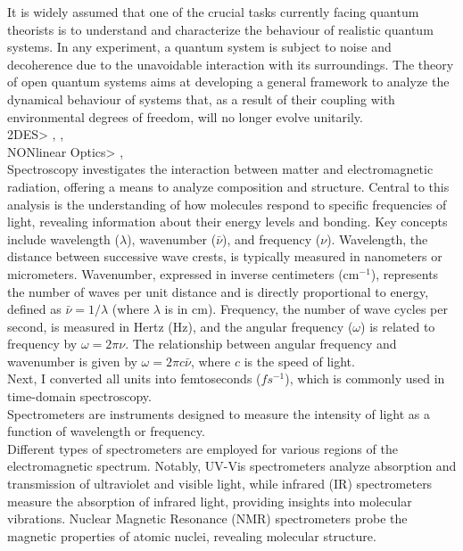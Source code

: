It is widely assumed that one of the crucial tasks currently facing quantum theorists
is to understand and characterize the behaviour of realistic quantum systems. In
any experiment, a quantum system is subject to noise and decoherence due to the
unavoidable interaction with its surroundings. The theory of open quantum systems
aims at developing a general framework to analyze the dynamical behaviour of systems
that, as a result of their coupling with environmental degrees of freedom, will no
longer evolve unitarily. \cite{rivasMarkovianMasterEquations2010}
\\
2DES> \cite{krumlandTwodimensionalElectronicSpectroscopy2023}, \cite{segarra-martiAccurateSimulationTwoDimensional2018}, \cite{sunTwodimensionalSpectroscopyOpen2024}
\\
NONlinear Optics> \cite{hammPrinciplesNonlinearOptical}, \cite{mukamelPrinciplesNonlinearOptical1995}
\\
Spectroscopy investigates the interaction between matter and electromagnetic radiation, offering a means to analyze composition and structure.
Central to this analysis is the understanding of how molecules respond to specific frequencies of light, revealing information about their energy levels and bonding.
Key concepts include wavelength ($\lambda$), wavenumber ($\bar{\nu}$), and frequency ($\nu$).
Wavelength, the distance between successive wave crests, is typically measured in nanometers or micrometers.
Wavenumber, expressed in inverse centimeters (cm$^{-1}$), represents the number of waves per unit distance and is directly proportional to energy, defined as $\bar{\nu} = 1/\lambda$ (where $\lambda$ is in cm).
Frequency, the number of wave cycles per second, is measured in Hertz (Hz), and the angular frequency ($\omega$) is related to frequency by $\omega = 2\pi\nu$.
The relationship between angular frequency and wavenumber is given by $\omega = 2\pi c \bar{\nu}$, where $c$ is the speed of light.\\
Next, I converted all units into femtoseconds ($fs^{-1}$), which is commonly used in time-domain spectroscopy.\\
Spectrometers are instruments designed to measure the intensity of light as a function of wavelength or frequency.\\
Different types of spectrometers are employed for various regions of the electromagnetic spectrum.
Notably, UV-Vis spectrometers analyze absorption and transmission of ultraviolet and visible light, while infrared (IR) spectrometers measure the absorption of infrared light, providing insights into molecular vibrations.
Nuclear Magnetic Resonance (NMR) spectrometers probe the magnetic properties of atomic nuclei, revealing molecular structure.
